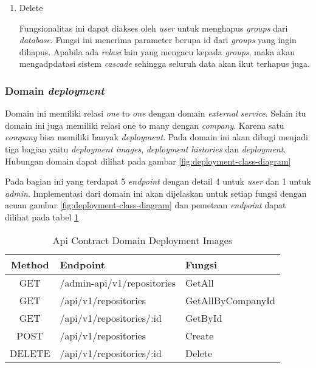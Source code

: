 \begin{enumerate}
  \item Delete

        Fungsionalitas ini dapat diakses oleh \textit{user} untuk menghapus \textit{groups} dari \textit{database}. Fungsi ini menerima parameter berupa id dari \textit{groups} yang ingin dihapus. Apabila ada \textit{relasi} lain yang mengacu kepada \textit{groups}, maka akan mengadpdatasi sistem \textit{cascade} sehingga seluruh data akan ikut terhapus juga.

\end{enumerate}


\subsubsection{Domain \textit{deployment}}

Domain ini memiliki relasi \textit{one} to \textit{one} dengan domain \textit{external service}. Selain itu domain ini juga memiliki relasi one to many dengan \textit{company}. Karena satu \textit{company} bisa memiliki banyak \textit{deployment}. Pada domain ini akan dibagi menjadi tiga bagian yaitu \textit{deployment images}, \textit{deployment histories} dan \textit{deployment}. Hubungan domain dapat dilihat pada gambar \ref{fig:deployment-class-diagram}

Pada bagian ini yang terdapat 5 \textit{endpoint} dengan detail 4 untuk \textit{user} dan 1 untuk \textit{admin}. Implementasi dari domain ini akan dijelaskan untuk setiap fungsi dengan acuan gambar \ref{fig:deployment-class-diagram} dan pemetaan \textit{endpoint} dapat dilihat pada tabel \ref{tab:api-contract-domain-deployment-images}

\bgroup
\begin{table}[ht]
  \caption{Api Contract Domain Deployment Images}
  \label{tab:api-contract-domain-deployment-images}
  \def\arraystretch{1.7}
  \centering
  \begin{tabular}{|c|p{6cm}|p{4cm}|}
    \hline
    Method & Endpoint                   &
    Fungsi                                                  \\
    \hline
    GET    & /admin-api/v1/repositories & GetAll            \\
    \hline
    GET    & /api/v1/repositories       & GetAllByCompanyId \\
    \hline
    GET    & /api/v1/repositories/:id   & GetById           \\
    \hline
    POST   & /api/v1/repositories       & Create            \\
    \hline
    DELETE & /api/v1/repositories/:id   & Delete            \\
    \hline
  \end{tabular}
\end{table}
\egroup

